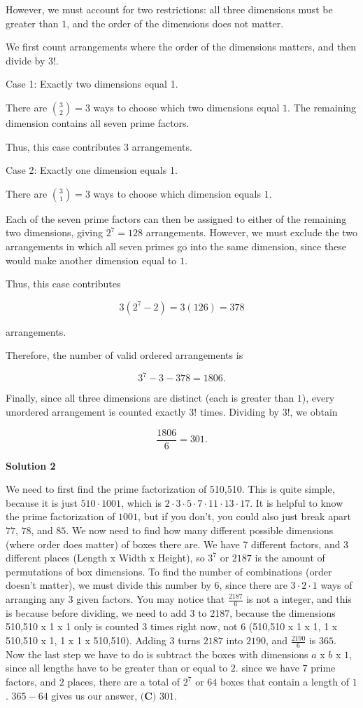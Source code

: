 \begin{enumerate}
 However, we must account for two restrictions: all three dimensions must be greater than $1$, and the order of the dimensions does not matter.

 We first count arrangements where the order of the dimensions matters, and then divide by $3!$.

 Case 1: Exactly two dimensions equal 1.

 There are $\binom{3}{2}=3$ ways to choose which two dimensions equal $1$. The remaining dimension contains all seven prime factors.

 Thus, this case contributes $3$ arrangements.

 Case 2: Exactly one dimension equals 1.

 There are $\binom{3}{1}=3$ ways to choose which dimension equals $1$.

 Each of the seven prime factors can then be assigned to either of the remaining two dimensions, giving $2^7=128$ arrangements. However, we must exclude the two arrangements in which all seven primes go into the same dimension, since these would make another dimension equal to $1$.

 Thus, this case contributes

 
 \[3(2^7-2)=3(126)=378\]

 arrangements.

 Therefore, the number of valid ordered arrangements is

 
 \[3^7-3-378=1806.\]

 Finally, since all three dimensions are distinct (each is greater than $1$), every unordered arrangement is counted exactly $3!$ times. Dividing by $3!$, we obtain

 
 \[\frac{1806}{6}=\boxed{301}.\]




\textbf{Solution 2}

We need to first find the prime factorization of 510,510. This is quite simple, because it is just $510\cdot1001$, which is $2\cdot3\cdot5\cdot7\cdot11\cdot13\cdot17$. It is helpful to know the prime factorization of $1001$, but if you don't, you could also just break apart $77$, $78$, and $85$. We now need to find how many different possible dimensions (where order does matter) of boxes there are. We have 7 different factors, and 3 different places (Length x Width x Height), so $3^7$ or $2187$ is the amount of permutations of box dimensions. To find the number of combinations (order doesn't matter), we must divide this number by $6$, since there are $3\cdot2\cdot1$ ways of arranging any $3$ given factors. You may notice that $\frac{2187}{6}$ is not a integer, and this is because before dividing, we need to add 3 to 2187, because the dimensions 510,510 x 1 x 1 only is counted 3 times right now, not $6$ (510,510 x 1 x 1, 1 x 510,510 x 1, 1 x 1 x 510,510). Adding $3$ turns $2187$ into $2190$, and $\frac{2190}{6}$ is $365$. Now the last step we have to do is subtract the boxes with dimensions $a$ x $b$ x $1$, since all lengths have to be greater than or equal to $2$. since we have $7$ prime factors, and $2$ places, there are a total of $2^7$ or $64$ boxes that contain a length of $1$. $365-64$ gives us our answer, $\boxed{\textbf{(C) } 301}$.


\end{enumerate}
